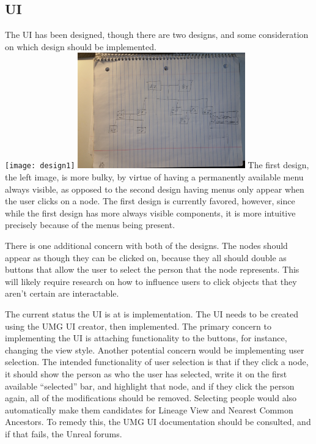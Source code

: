 \documentclass[onecolumn, draftclsnofoot, 10pt, compsoc]{IEEEtran}
\begin{document}
\subsection{UI}
\begin{singlespace}
The UI has been designed, though there are two designs, and some consideration on which design should be implemented.\\
\newline
\texttt{[image: design1]}
\includegraphics[height=5cm]{design2}
\newline
The first design, the left image, is more bulky, by virtue of having a permanently available menu always visible, as opposed to the second design having menus only appear when the user clicks on a node. The first design is currently favored, however, since while the first design has more always visible components, it is more intuitive precisely because of the menus being present. 


There is one additional concern with both of the designs. The nodes should appear as though they can be clicked on, because they all should double as buttons that allow the user to select the person that the node represents. This will likely require research on how to influence users to click objects that they aren't certain are interactable.

The current status the UI is at is implementation. The UI needs to be created using the UMG UI creator, then implemented. The primary concern to implementing the UI is attaching functionality to the buttons, for instance, changing the view style. Another potential concern would be implementing user selection. The intended functionality of user selection is that if they click a node, it should show the person as who the user has selected, write it on the first available “selected” bar, and highlight that node, and if they click the person again, all of the modifications should be removed. Selecting people would also automatically make them candidates for Lineage View and Nearest Common Ancestors. To remedy this, the UMG UI documentation should be consulted, and if that fails, the Unreal forums.
\end{singlespace}
\end{document}
